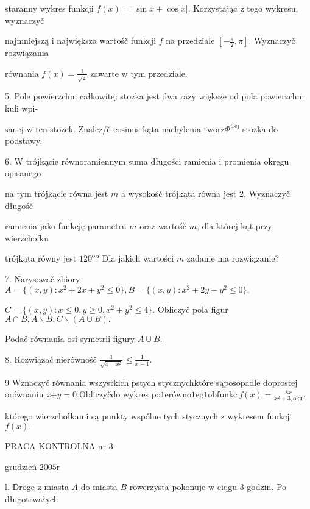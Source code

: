 \documentclass[a4paper,12pt]{article}
\begin{document}
staranny wykres funkcji $f(x)=|\sin x+\cos x|$. Korzystając $\mathrm{z}$ tego wykresu, wyznaczyč

najmniejszą $\mathrm{i}$ największa wartośč funkcji $f$ na przedziale $[-\displaystyle \frac{\pi}{2},\pi]$. Wyznaczyč rozwiązania

równania $f(x)=\displaystyle \frac{1}{\sqrt{2}}$ zawarte $\mathrm{w}$ tym przedziale.

5. Pole powierzchni całkowitej stozka jest dwa razy większe od pola powierzchni kuli wpi-

sanej $\mathrm{w}$ ten stozek. Znalez/č cosinus kąta nachylenia $\mathrm{t}\mathrm{w}\mathrm{o}\mathrm{r}\mathrm{z}\Phi^{\mathrm{C}\mathrm{e}\mathrm{j}}$ stozka do podstawy.

6. $\mathrm{W}$ trójkącie równoramiennym suma długości ramienia $\mathrm{i}$ promienia okręgu opisanego

na tym trójkącie równa jest $m$ a wysokośč trójkąta równa jest 2. Wyznaczyč długośč

ramienia jako funkcję parametru $m$ oraz wartośč $m$, dla której kąt przy wierzchofku

trójkąta równy jest $120^{\mathrm{o}}$? Dla jakich wartości $m$ zadanie ma rozwiązanie?

7. Narysowač zbiory $A=\{(x,y):x^{2}+2x+y^{2}\leq 0\}, B= \{(x,y):x^{2}+2y+y^{2}\leq 0\},$

$C=\{(x,y):x\leq 0,y\geq 0,x^{2}+y^{2}\leq 4\}$. Obliczyč pola figur $A\cap B, A\backslash B, C\backslash (A\cup B).$

Podač równania osi symetrii figury $A\cup B.$

8. Rozwiązač nierównośč $\displaystyle \frac{1}{\sqrt{4-x^{2}}}\leq\frac{1}{x-1}.$

9 $\mathrm{W}\mathrm{z}$naczyč równania wszystkich pstych stycznychktóre s$\text{ą} \mathrm{p}\mathrm{o}\mathrm{s}\mathrm{o}$padle d$\mathrm{o}\mathrm{p}$rostej orównaniu {\it x}$+y=0.$Obliczyčdo wykres p$\mathrm{o}1\mathrm{e}\mathrm{r}\text{ó} \mathrm{w}\mathrm{n}\mathrm{o}1\mathrm{e}\mathrm{g}1$obfunkc {\it f}$(x)=\displaystyle \frac{8x}{x^{2}+3,\mathrm{o}\mathrm{k}\mathrm{u}},$

którego wierzchołkami są punkty wspólne tych stycznych $\mathrm{z}$ wykresem funkcji $f(x).$





PRACA KONTROLNA nr 3

grudzień $2005\mathrm{r}$

l. Droge $\mathrm{z}$ miasta $A$ do miasta $B$ rowerzysta pokonuje $\mathrm{w}$ ciqgu 3 godzin. Po długotrwałych
\end{document}

